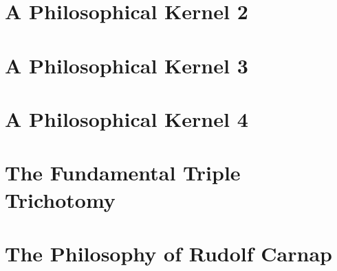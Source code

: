 \documentclass[10pt,titlepage]{book}
\begin{document}


\chapter{A Philosophical Kernel 2}



\chapter{A Philosophical Kernel 3}



\chapter{A Philosophical Kernel 4}\label{PK}



\theendnotes
\setcounter{endnote}{0}

\chapter{The Fundamental Triple Trichotomy}\label{FTT}



\theendnotes
\setcounter{endnote}{0}

\appendix

\chapter{The Philosophy of Rudolf Carnap}\label{PRC}



\theendnotes
\setcounter{endnote}{0}

\theendnotes

\listoftables

{}



\renewcommand{\indexname}{Index of Defined Terms}
{\twocolumn[]
{\small\printindex}}


\end{document}
